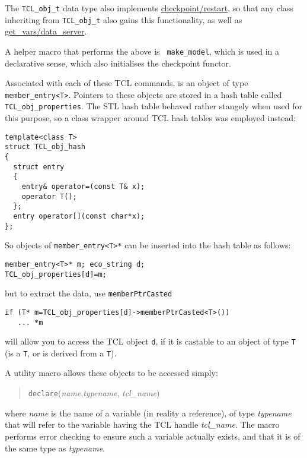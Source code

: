 The {\tt TCL\_obj\_t} data type also implements \hyperref{checkpoint
  and restart functions}{checkpoint and restart
  functions (\S}{)}{checkpoint/restart},
so that any class inheriting from {\tt TCL\_obj\_t}
also gains this functionality, as well as \hyperref{client-server
  functionality}{\S(}{)}{get_vars/data_server}.

A helper macro that performs the above is {\tt
  make\_model}, which is used in a declarative
sense, which also initialises the checkpoint functor.


Associated with each of these TCL commands, is an object of type
\verb+member_entry<T>+. Pointers to these objects
are stored in a hash table called
\verb+TCL_obj_properties+. The STL hash
table behaved rather stangely when used for this purpose, so a class
wrapper around TCL hash tables was employed instead:
\begin{verbatim}
template<class T>
struct TCL_obj_hash
{
  struct entry 
  {
    entry& operator=(const T& x);
    operator T();
  };
  entry operator[](const char*x);
};
\end{verbatim}
So objects of \verb+member_entry<T>*+ can be inserted into the hash
table as follows:
\begin{verbatim}
member_entry<T>* m; eco_string d;
TCL_obj_properties[d]=m;
\end{verbatim}
but to extract the data, use \verb+memberPtrCasted+
\begin{verbatim}
if (T* m=TCL_obj_properties[d]->memberPtrCasted<T>())
   ... *m 
\end{verbatim}
will allow you to access the TCL object \verb+d+, if it is castable to
an object of type \verb+T+ (is a \verb+T+, or is derived from a \verb+T+). 

A utility macro allows these objects to be accessed simply:
\begin{verse}
{\tt declare}({\em name},{\em typename}, {\em tcl\_name})
\end{verse}
where {\em name} is the name of a variable (in reality a reference),
of type {\em typename} that will refer to the variable having the TCL
handle {\em tcl\_name}. The macro performs error checking to ensure
such a variable actually exists, and that it is of the same type as
{\em typename}.


